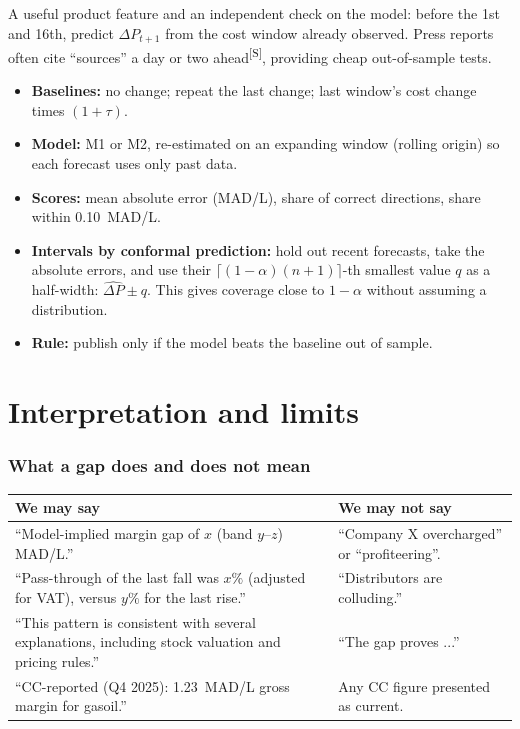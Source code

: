 \documentclass[11pt,a4paper]{article}
\newcommand{\tagS}{\textsuperscript{\textcolor{orange!80!black}{\textsf{\scriptsize[S]}}}}
\theoremstyle{definition}
\begin{document}
A useful product feature and an independent check on the model: before the 1st and 16th, predict $\Delta P_{t+1}$ from the cost window already observed. Press reports often cite ``sources'' a day or two ahead\tagS, providing cheap out-of-sample tests.
\begin{itemize}
\item \textbf{Baselines:} no change; repeat the last change; last window's cost change times $(1+\tau)$.
\item \textbf{Model:} M1 or M2, re-estimated on an expanding window (rolling origin) so each forecast uses only past data.
\item \textbf{Scores:} mean absolute error (MAD/L), share of correct directions, share within 0.10~MAD/L.
\item \textbf{Intervals by conformal prediction:} hold out recent forecasts, take the absolute errors, and use their $\lceil(1-\alpha)(n+1)\rceil$-th smallest value $q$ as a half-width: $\hat{\Delta P}\pm q$. This gives coverage close to $1-\alpha$ without assuming a distribution.
\item \textbf{Rule:} publish only if the model beats the baseline out of sample.
\end{itemize}

\part{Interpretation and limits}

\section{What a gap does and does not mean}

\begin{center}
\small
\begin{tabular}{p{6.3cm}p{6.3cm}}
\toprule
We may say & We may not say \\
\midrule
``Model-implied margin gap of $x$ (band $y$--$z$) MAD/L.'' & ``Company X overcharged'' or ``profiteering''. \\
``Pass-through of the last fall was $x\%$ (adjusted for VAT), versus $y\%$ for the last rise.'' & ``Distributors are colluding.'' \\
``This pattern is consistent with several explanations, including stock valuation and pricing rules.'' & ``The gap proves ...'' \\
``CC-reported (Q4 2025): 1.23~MAD/L gross margin for gasoil.'' & Any CC figure presented as current. \\
\bottomrule
\end{tabular}
\end{center}
\end{document}
